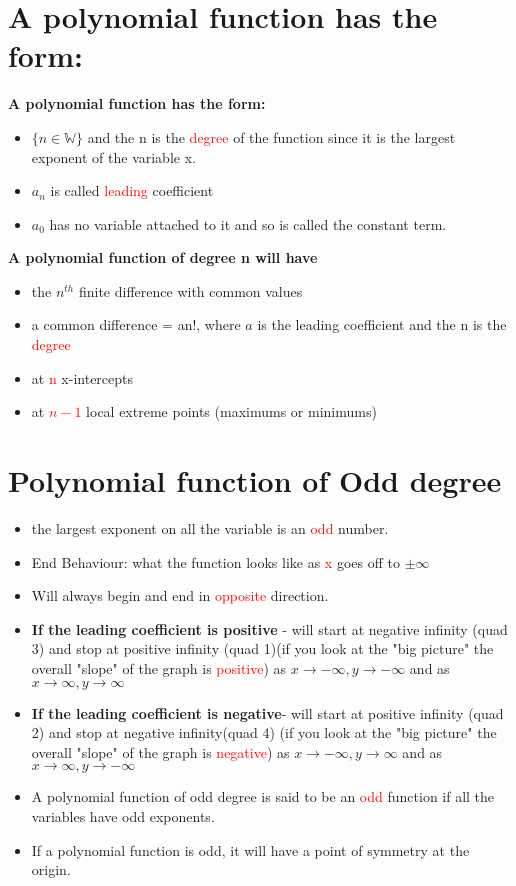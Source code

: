 \documentclass{article}
\begin{document}
\section{A polynomial function has the form:}
\textbf{A polynomial function has the form:}
\begin{itemize}
    \item $\{ n \in \mathbb{W}\}$ and the n is the \textcolor{red}{degree} of the function since it is the largest exponent of the variable x.
    \item $a_n$ is called \textcolor{red}{leading} coefficient
    \item $a_0$ has no variable attached to it and so is called the constant term.
\end{itemize}
\textbf{A polynomial function of degree n will have}
\begin{itemize}
    \item the $n^{th}$ finite difference with common values
    \item a common difference = an!, where $a$ is the leading coefficient and the n is the \textcolor{red}{degree} 
    \item at \textcolor{red}{n} x-intercepts
    \item at \textcolor{red}{$n-1$} local extreme points (maximums or minimums)
\end{itemize}
\section{Polynomial function of Odd degree}

\begin{itemize}
    \item the largest exponent on all the variable is an \textcolor{red}{odd} number.
    \item End Behaviour: what the function looks like as \textcolor{red}{x} goes off to $\pm \infty$
    \item Will always begin and end in \textcolor{red}{opposite} direction.
    \item \textbf{If the leading coefficient is positive} - will start at negative infinity (quad 3) and stop at positive infinity (quad 1)(if you look at the "big picture" the overall "slope" of the graph is \textcolor{red}{positive}) as $x \to -\infty, y \to -\infty$ and as $x \to \infty, y \to \infty$
    \item \textbf{If the leading coefficient is negative}- will start at positive infinity (quad 2) and stop at negative infinity(quad 4) (if you look at the "big picture" the overall "slope" of the graph is \textcolor{red}{negative}) as $x \to -\infty, y \to \infty$ and as $x \to \infty, y \to -\infty$
    \item A polynomial function of odd degree is said to be an \textcolor{red}{odd} function if all the variables have odd exponents.
    \item If a polynomial function is odd, it will have a point of symmetry at the origin.
\end{itemize}
\end{document}
